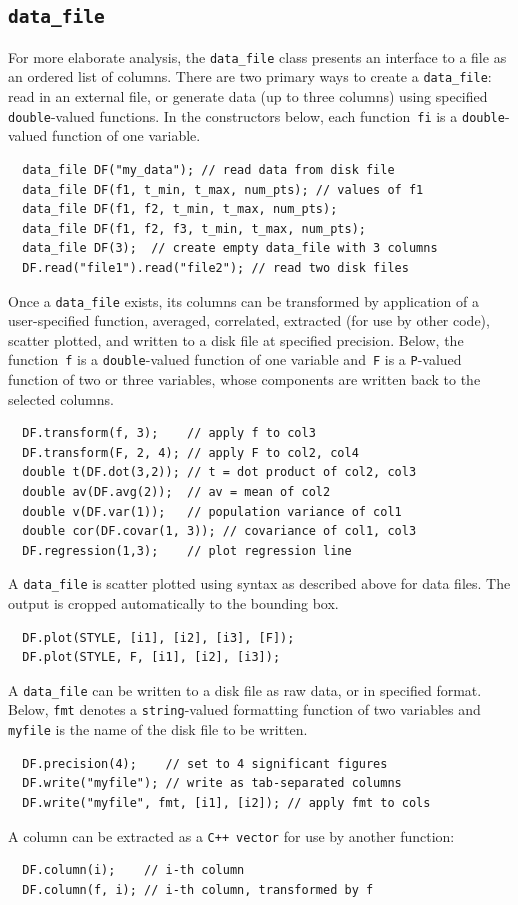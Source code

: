 \documentclass[12pt]{report}
\newcommand{\code}[1]{\texttt{#1}}
\newcommand{\filename}[1]{\texttt{#1}}
\begin{document}
\subsection*{\code{data\_file}}

For more elaborate analysis, the \code{data\_file} class presents an
interface to a file as an ordered list of columns. There are two
primary ways to create a \code{data\_file}: read in an external file,
or generate data (up to three columns) using specified
\code{double}-valued functions. In the constructors below, each
function~\code{fi} is a \code{double}-valued function of one variable.
\begin{verbatim}
  data_file DF("my_data"); // read data from disk file
  data_file DF(f1, t_min, t_max, num_pts); // values of f1
  data_file DF(f1, f2, t_min, t_max, num_pts);
  data_file DF(f1, f2, f3, t_min, t_max, num_pts);
  data_file DF(3);  // create empty data_file with 3 columns
  DF.read("file1").read("file2"); // read two disk files
\end{verbatim}

Once a \code{data\_file} exists, its columns can be transformed by
application of a user-specified function, averaged, correlated,
extracted (for use by other code), scatter plotted, and written to a
disk file at specified precision. Below, the function~\code{f} is a
\code{double}-valued function of one variable and~\code{F} is a
\code{P}-valued function of two or three variables, whose components
are written back to the selected columns.
\begin{verbatim}
  DF.transform(f, 3);    // apply f to col3
  DF.transform(F, 2, 4); // apply F to col2, col4
  double t(DF.dot(3,2)); // t = dot product of col2, col3
  double av(DF.avg(2));  // av = mean of col2
  double v(DF.var(1));   // population variance of col1
  double cor(DF.covar(1, 3)); // covariance of col1, col3
  DF.regression(1,3);    // plot regression line
\end{verbatim}
A \code{data\_file} is scatter plotted using syntax as described above for
data files. The output is cropped automatically to the bounding box.
\begin{verbatim}
  DF.plot(STYLE, [i1], [i2], [i3], [F]);
  DF.plot(STYLE, F, [i1], [i2], [i3]);
\end{verbatim}

A \code{data\_file} can be written to a disk file as raw data, or in
specified format. Below, \code{fmt} denotes a \code{string}-valued
formatting function of two variables and \filename{myfile} is the
name of the disk file to be written.
\begin{verbatim}
  DF.precision(4);    // set to 4 significant figures
  DF.write("myfile"); // write as tab-separated columns
  DF.write("myfile", fmt, [i1], [i2]); // apply fmt to cols
\end{verbatim}
A column can be extracted as a \code{C++}~\code{vector} for
use by another function:
\begin{verbatim}
  DF.column(i);    // i-th column
  DF.column(f, i); // i-th column, transformed by f
\end{verbatim}
\end{document}

